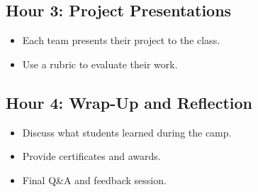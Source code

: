 \documentclass[main.tex]{subfiles}
\begin{document}
\subsection*{Hour 3: Project Presentations}
\begin{itemize}
    \item Each team presents their project to the class.
    \item Use a rubric to evaluate their work.
\end{itemize}

\subsection*{Hour 4: Wrap-Up and Reflection}
\begin{itemize}
    \item Discuss what students learned during the camp.
    \item Provide certificates and awards.
    \item Final Q&A and feedback session.
\end{itemize}
\end{document}
